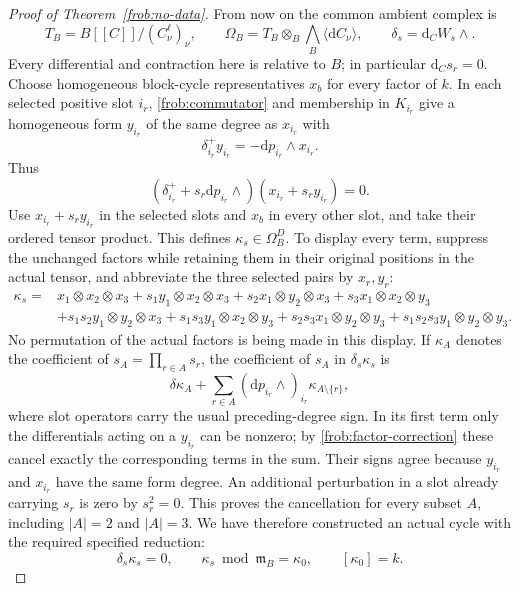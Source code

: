 \begin{proof}[Proof of Theorem~\ref{frob:no-data}]
From now on the common ambient complex is
\begin{equation}
 T_B=B[[C]]/(C_\nu^\ell)_\nu,
 \qquad \Omega_B=T_B\otimes_B\bigwedge_B\langle\mathrm dC_\nu\rangle,
 \qquad \delta_s=\mathrm d_CW_s\wedge{}.
 \label{frob:common-complex}
\end{equation}
Every differential and contraction here is relative to $B$; in
particular $\mathrm d_Cs_r=0$.  Choose homogeneous block-cycle
representatives $x_b$ for every factor of $k$.  In each selected
positive slot $i_r$, \eqref{frob:commutator} and membership in $K_{i_r}$
give a homogeneous form $y_{i_r}$ of the same degree as $x_{i_r}$ with
\begin{equation}
 \delta_{i_r}^+y_{i_r}=-\mathrm dp_{i_r}\wedge x_{i_r}.
 \label{frob:factor-correction}
\end{equation}
Thus
\[
 (\delta_{i_r}^++s_r\mathrm dp_{i_r}\wedge{})
                         (x_{i_r}+s_ry_{i_r})=0.
\]
Use $x_{i_r}+s_ry_{i_r}$ in the selected slots and $x_b$ in every
other slot, and take their ordered tensor product.  This defines
$\kappa_s\in\Omega_B^D$.  To display every term, suppress the unchanged
factors while retaining them in their original positions in the actual
tensor, and abbreviate the three selected pairs by $x_r,y_r$:
\begin{equation}
\begin{split}
 \kappa_s={}&x_1\otimes x_2\otimes x_3
 +s_1y_1\otimes x_2\otimes x_3
 +s_2x_1\otimes y_2\otimes x_3
 +s_3x_1\otimes x_2\otimes y_3\\
 &+s_1s_2y_1\otimes y_2\otimes x_3
 +s_1s_3y_1\otimes x_2\otimes y_3
 +s_2s_3x_1\otimes y_2\otimes y_3
 +s_1s_2s_3y_1\otimes y_2\otimes y_3.
\end{split}
 \label{frob:eight-terms}
\end{equation}
No permutation of the actual factors is being made in this display.
If $\kappa_A$ denotes the coefficient of $s_A=\prod_{r\in A}s_r$,
the coefficient of $s_A$ in $\delta_s\kappa_s$ is
\begin{equation}
 \delta\kappa_A+
      \sum_{r\in A}(\mathrm dp_{i_r}\wedge{})_{i_r}
                                     \kappa_{A\setminus\{r\}},
 \label{frob:lift-coefficients}
\end{equation}
where slot operators carry the usual preceding-degree sign.  In its
first term only the differentials acting on a $y_{i_r}$ can be
nonzero; by \eqref{frob:factor-correction} these cancel exactly the
corresponding terms in the sum.  Their signs agree because $y_{i_r}$
and $x_{i_r}$ have the same form degree.  An additional perturbation
in a slot already carrying $s_r$ is zero by $s_r^2=0$.  This proves
the cancellation for every subset $A$, including $|A|=2$ and $|A|=3$.
We have therefore constructed an actual cycle with the required
specified reduction:
\begin{equation}
 \delta_s\kappa_s=0,\qquad
         \kappa_s\bmod\mathfrak m_B=\kappa_0,
 \qquad [\kappa_0]=k.
 \label{frob:lifted-cycle}
\end{equation}


\end{proof}
